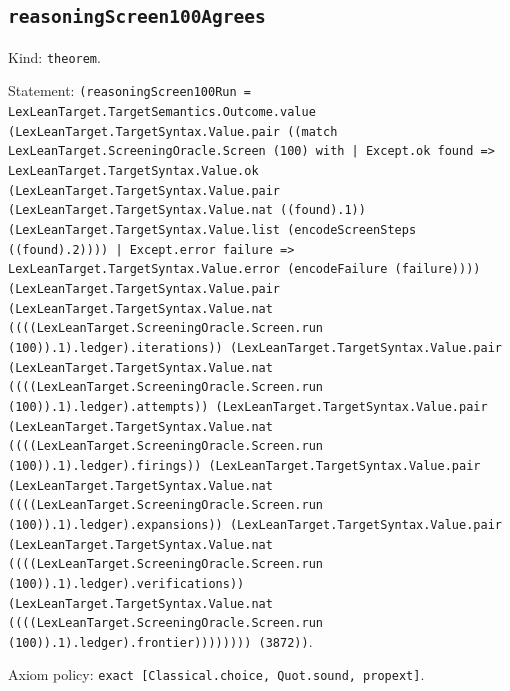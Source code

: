 \documentclass[11pt]{article}
\begin{document}
\subsection*{\texttt{reasoningScreen100Agrees}}
\noindent Kind: \texttt{theorem}.\par
\noindent Statement: \texttt{(reasoningScreen100Run = LexLeanTarget.TargetSemantics.Outcome.value (LexLeanTarget.TargetSyntax.Value.pair ((match LexLeanTarget.ScreeningOracle.Screen (100) with | Except.ok found => LexLeanTarget.TargetSyntax.Value.ok (LexLeanTarget.TargetSyntax.Value.pair (LexLeanTarget.TargetSyntax.Value.nat ((found).1)) (LexLeanTarget.TargetSyntax.Value.list (encodeScreenSteps ((found).2)))) | Except.error failure => LexLeanTarget.TargetSyntax.Value.error (encodeFailure (failure)))) (LexLeanTarget.TargetSyntax.Value.pair (LexLeanTarget.TargetSyntax.Value.nat ((((LexLeanTarget.ScreeningOracle.Screen.run (100)).1).ledger).iterations)) (LexLeanTarget.TargetSyntax.Value.pair (LexLeanTarget.TargetSyntax.Value.nat ((((LexLeanTarget.ScreeningOracle.Screen.run (100)).1).ledger).attempts)) (LexLeanTarget.TargetSyntax.Value.pair (LexLeanTarget.TargetSyntax.Value.nat ((((LexLeanTarget.ScreeningOracle.Screen.run (100)).1).ledger).firings)) (LexLeanTarget.TargetSyntax.Value.pair (LexLeanTarget.TargetSyntax.Value.nat ((((LexLeanTarget.ScreeningOracle.Screen.run (100)).1).ledger).expansions)) (LexLeanTarget.TargetSyntax.Value.pair (LexLeanTarget.TargetSyntax.Value.nat ((((LexLeanTarget.ScreeningOracle.Screen.run (100)).1).ledger).verifications)) (LexLeanTarget.TargetSyntax.Value.nat ((((LexLeanTarget.ScreeningOracle.Screen.run (100)).1).ledger).frontier)))))))) (3872))}.\par
\noindent Axiom policy: \texttt{exact [Classical.choice, Quot.sound, propext]}.\par
\end{document}
